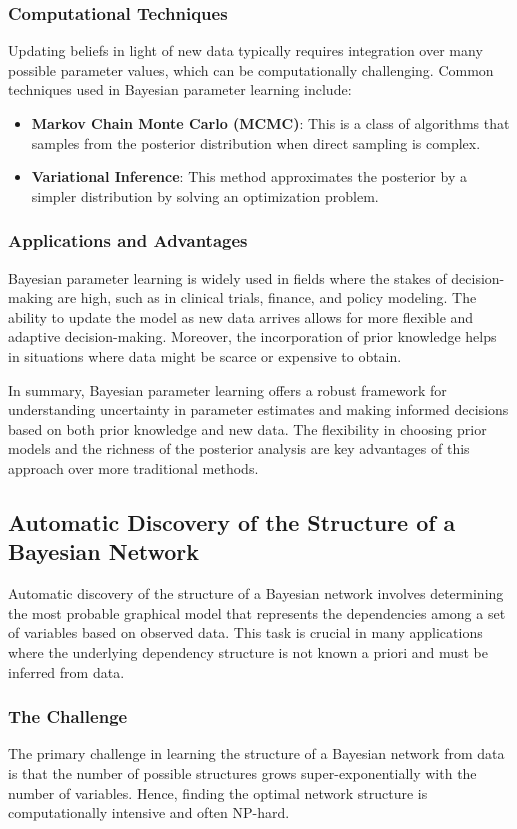 \subsubsection{Computational Techniques}
Updating beliefs in light of new data typically requires integration over many possible parameter values, which can be computationally challenging. Common techniques used in Bayesian parameter learning include:
\begin{itemize}
    \item \textbf{Markov Chain Monte Carlo (MCMC)}: This is a class of algorithms that samples from the posterior distribution when direct sampling is complex.
    \item \textbf{Variational Inference}: This method approximates the posterior by a simpler distribution by solving an optimization problem.
\end{itemize}

\subsubsection{Applications and Advantages}
Bayesian parameter learning is widely used in fields where the stakes of decision-making are high, such as in clinical trials, finance, and policy modeling. The ability to update the model as new data arrives allows for more flexible and adaptive decision-making. Moreover, the incorporation of prior knowledge helps in situations where data might be scarce or expensive to obtain.

In summary, Bayesian parameter learning offers a robust framework for understanding uncertainty in parameter estimates and making informed decisions based on both prior knowledge and new data. The flexibility in choosing prior models and the richness of the posterior analysis are key advantages of this approach over more traditional methods.

\subsection{Automatic Discovery of the Structure of a Bayesian Network}
Automatic discovery of the structure of a Bayesian network involves determining the most probable graphical model that represents the dependencies among a set of variables based on observed data. This task is crucial in many applications where the underlying dependency structure is not known a priori and must be inferred from data.

\subsubsection{The Challenge}
The primary challenge in learning the structure of a Bayesian network from data is that the number of possible structures grows super-exponentially with the number of variables. Hence, finding the optimal network structure is computationally intensive and often NP-hard.

